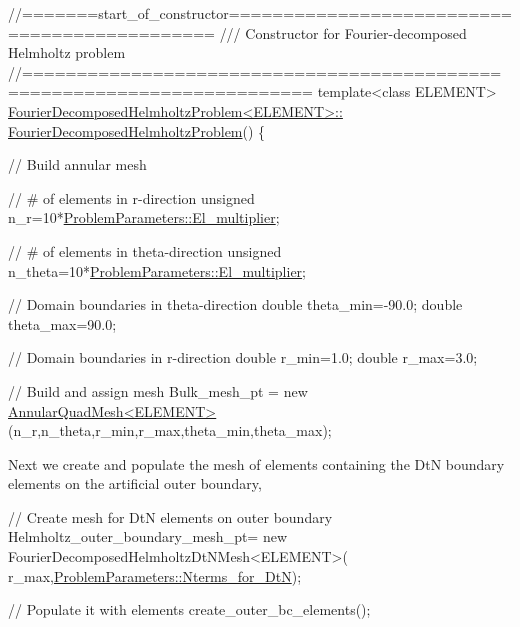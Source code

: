  
\begin{DoxyCodeInclude}
\textcolor{comment}{//=======start\_of\_constructor=============================================}
\textcolor{comment}{/// Constructor for Fourier-decomposed Helmholtz problem}
\textcolor{comment}{}\textcolor{comment}{//========================================================================}
\textcolor{keyword}{template}<\textcolor{keyword}{class} ELEMENT>
\hyperlink{classFourierDecomposedHelmholtzProblem_ab368ed8fe04d4e3db67d13bab9e7b52e}{FourierDecomposedHelmholtzProblem<ELEMENT>::}
\hyperlink{classFourierDecomposedHelmholtzProblem_ab368ed8fe04d4e3db67d13bab9e7b52e}{FourierDecomposedHelmholtzProblem}()
\{ 

\textcolor{comment}{// Build annular mesh}
  
\textcolor{comment}{// # of elements in r-direction }
 \textcolor{keywordtype}{unsigned} n\_r=10*\hyperlink{namespaceProblemParameters_a23b618b9e3a0d282fd91aa3f3f7b9254}{ProblemParameters::El\_multiplier};
 
 \textcolor{comment}{// # of elements in theta-direction }
 \textcolor{keywordtype}{unsigned} n\_theta=10*\hyperlink{namespaceProblemParameters_a23b618b9e3a0d282fd91aa3f3f7b9254}{ProblemParameters::El\_multiplier};
 
 \textcolor{comment}{// Domain boundaries in theta-direction}
 \textcolor{keywordtype}{double} theta\_min=-90.0;
 \textcolor{keywordtype}{double} theta\_max=90.0;
 
 \textcolor{comment}{// Domain boundaries in r-direction}
 \textcolor{keywordtype}{double} r\_min=1.0;
 \textcolor{keywordtype}{double} r\_max=3.0;
 
 \textcolor{comment}{// Build and assign mesh}
 Bulk\_mesh\_pt = 
  \textcolor{keyword}{new} \hyperlink{classAnnularQuadMesh}{AnnularQuadMesh<ELEMENT>}(n\_r,n\_theta,r\_min,r\_max,theta\_min,theta\_max);

\end{DoxyCodeInclude}


Next we create and populate the mesh of elements containing the DtN boundary elements on the artificial outer boundary,


\begin{DoxyCodeInclude}

 \textcolor{comment}{// Create mesh for DtN elements on outer boundary}
 Helmholtz\_outer\_boundary\_mesh\_pt=
  \textcolor{keyword}{new} FourierDecomposedHelmholtzDtNMesh<ELEMENT>(
   r\_max,\hyperlink{namespaceProblemParameters_aa529b33b7feb959e0c044447bf0f6c6f}{ProblemParameters::Nterms\_for\_DtN});

 \textcolor{comment}{// Populate it with elements}
 create\_outer\_bc\_elements();

\end{DoxyCodeInclude}


